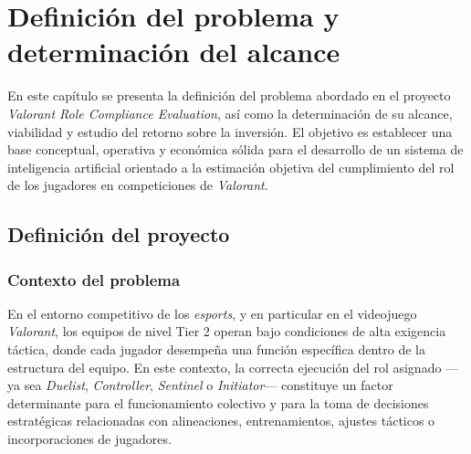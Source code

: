 \documentclass{ULBreport} %
\begin{document}

\tableofcontents
\listoftables
\listoffigures



\chapter{Definición del problema y determinación del alcance}

En este capítulo se presenta la definición del problema abordado en el proyecto \textit{Valorant Role Compliance Evaluation}, así como la determinación de su alcance, viabilidad y estudio del retorno sobre la inversión. El objetivo es establecer una base conceptual, operativa y económica sólida para el desarrollo de un sistema de inteligencia artificial orientado a la estimación objetiva del cumplimiento del rol de los jugadores en competiciones de \textit{Valorant}.

\section{Definición del proyecto}

\subsection{Contexto del problema}

En el entorno competitivo de los \textit{esports}, y en particular en el videojuego \textit{Valorant}, los equipos de nivel Tier 2 operan bajo condiciones de alta exigencia táctica, donde cada jugador desempeña una función específica dentro de la estructura del equipo. En este contexto, la correcta ejecución del rol asignado ---ya sea \textit{Duelist}, \textit{Controller}, \textit{Sentinel} o \textit{Initiator}--- constituye un factor determinante para el funcionamiento colectivo y para la toma de decisiones estratégicas relacionadas con alineaciones, entrenamientos, ajustes tácticos o incorporaciones de jugadores.
\end{document}
